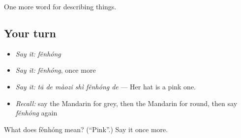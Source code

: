 \begin{grammarlens}[title={What you've built}]
One more word for describing things.
\end{grammarlens}

\subsection*{Your turn}
\begin{itemize}
\raggedright
  \item \emph{Say it:} \emph{fěnhóng}
  \item \emph{Say it:} \emph{fěnhóng}, once more
  \item \emph{Say it:} \emph{tā de màozi shì fěnhóng de} — Her hat is a pink one.
  \item \emph{Recall:} say the Mandarin for grey, then the Mandarin for round, then say \emph{fěnhóng} again
\end{itemize}

\begin{tcolorbox}[breakable,colback=teal!4,colframe=teal!35!black,title={Before you move on}]
What does fěnhóng mean? (\textquotedblleft{}Pink\textquotedblright{}.) Say it once more.
\end{tcolorbox}

